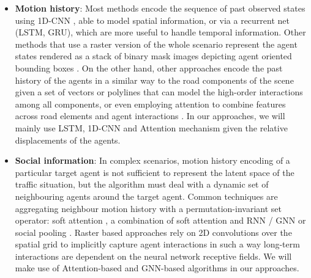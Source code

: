 \begin{itemize}
	
	\item \textbf{Motion history}: Most methods encode the sequence of past observed states using 1D-\ac{CNN} \cite{liang2020learning, mercat2020multi}, able to model spatial information, or via a recurrent net \cite{alahi2016social} (\ac{LSTM}, \ac{GRU}), which are more useful to handle temporal information. Other methods that use a raster version of the whole scenario represent the agent states rendered as a stack of binary mask images depicting agent oriented bounding boxes \cite{gilles2021home}. On the other hand, other approaches encode the past history of the agents in a similar way to the road components of the scene given a set of vectors or polylines \cite{zhao2021tnt, gao2020vectornet} that can model the high-order interactions among all components, or even employing attention to combine features across road elements and agent interactions \cite{ngiam2022scene}. In our approaches, we will mainly use \ac{LSTM}, 1D-\ac{CNN} and Attention mechanism given the relative displacements of the agents.
	
	\item \textbf{Social information}: In complex scenarios, motion history encoding of a particular target agent is not sufficient to represent the latent space of the traffic situation, but the algorithm must deal with a dynamic set of neighbouring agents around the target agent. Common techniques are aggregating neighbour motion history with a permutation-invariant set operator: soft attention \cite{ngiam2022scene}, a combination of soft attention and \ac{RNN} \cite{varadarajan2022multipath++} / \ac{GNN} \cite{schmidt2022crat} or social pooling \cite{alahi2016social, gupta2018social}. Raster based approaches rely on 2D convolutions \cite{chai2019multipath} \cite{casas2021mp3} over the spatial grid to implicitly capture agent interactions in such a way long-term interactions are dependent on the neural network receptive fields. We will make use of Attention-based and \ac{GNN}-based algorithms in our approaches.
	

\end{itemize}
